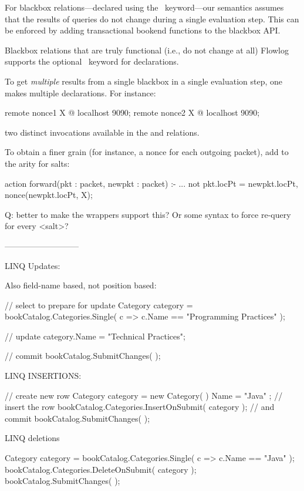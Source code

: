 For blackbox relations---declared using the \kwremote\
keyword---our semantics assumes that the results of queries do
not change during a single evaluation step. This can be enforced
by adding transactional bookend functions to the blackbox API. 

Blackbox relations that are truly functional (i.e., do not change
at all) Flowlog supports the optional \kwpure\ keyword for
declarations.

To get \emph{multiple} results from a single blackbox in a single
evaluation step, one makes multiple declarations. For instance:

\begin{flowlog}
  remote nonce1 {X} @ localhost 9090;
  remote nonce2 {X} @ localhost 9090;
\end{flowlog}

\noindent two distinct invocations available in the 
and  relations.

To obtain a finer grain (for instance, a nonce for each outgoing
packet), add to the arity for salts:

\begin{flowlog}
action forward(pkt : packet, newpkt : packet) :-
  ...
  not pkt.locPt = newpkt.locPt,
  nonce(newpkt.locPt, X);
\end{flowlog}

Q: better to make the wrappers support this? Or some syntax to force
re-query for every <salt>?



---------------------------

LINQ Updates:

Also field-name based, not position based:

// select to prepare for update
Category category = 
  bookCatalog.Categories.Single( c => c.Name == "Programming Practices" );

// update
category.Name = "Technical Practices";

// commit
bookCatalog.SubmitChanges( );


LINQ INSERTIONS:

// create new row
Category category = new Category( ) { Name = "Java" };
// insert the row
bookCatalog.Categories.InsertOnSubmit( category );
// and commit
bookCatalog.SubmitChanges( );

LINQ deletions

Category category = bookCatalog.Categories.Single( c => c.Name == "Java" );
bookCatalog.Categories.DeleteOnSubmit( category );
bookCatalog.SubmitChanges( );


